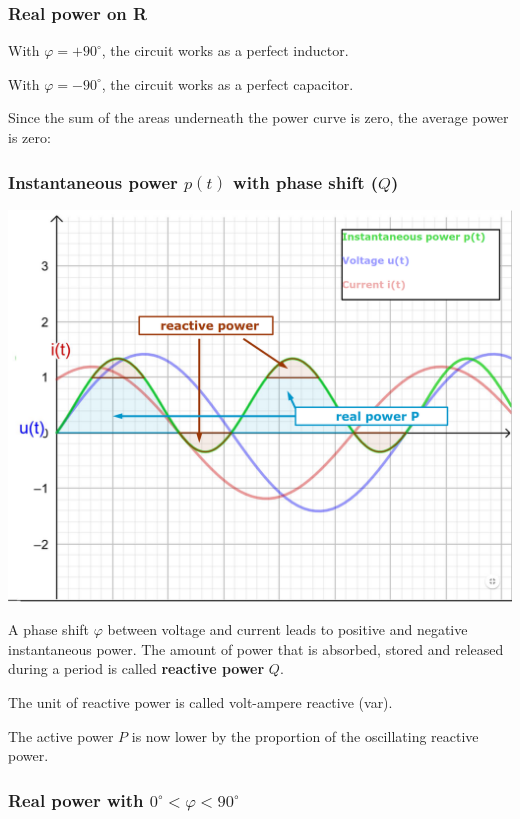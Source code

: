 \documentclass{article}
\begin{document}
\subsubsection{Real power on R}

With $\varphi = +90^{\circ}$, the circuit works as a perfect inductor.

With $\varphi = -90^{\circ}$, the circuit works as a perfect capacitor.

Since the sum of the areas underneath the power curve is zero, the
average power is zero:

\subsubsection{Instantaneous power $p(t)$ with phase shift ($Q$)}
\begin{center}
    \includegraphics[width=.7\textwidth]{media/instant_power_phaseshift.png}
\end{center}
A phase shift $\varphi$ between voltage and current leads to positive
and negative instantaneous power. The amount of power that is absorbed,
stored and released during a period is called \textbf{reactive power} $Q$.

The unit of reactive power is called volt-ampere reactive (var).

The active power $P$ is now lower by the proportion of the oscillating
reactive power.

\subsubsection{Real power with $0^{\circ} < \varphi < 90^{\circ}$}
\end{document}
